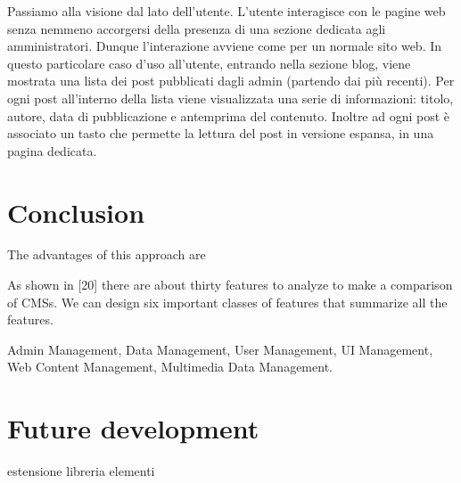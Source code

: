 \documentclass{sig-alternate}
\begin{document}
Passiamo alla visione dal lato dell'utente. 
L'utente interagisce con le pagine web senza nemmeno accorgersi della presenza di una sezione dedicata agli amministratori. Dunque l'interazione avviene come per un normale sito web. In questo particolare caso d'uso all'utente, entrando nella sezione blog, viene mostrata una lista dei post pubblicati dagli admin (partendo dai più recenti). Per ogni post all'interno della lista viene visualizzata una serie di informazioni: titolo, autore, data di pubblicazione e antemprima del contenuto. Inoltre ad ogni post è associato un tasto che permette la lettura del post in versione espansa, in una pagina dedicata.
\section{Conclusion}

The advantages of this approach are
 
As shown in [20] there are about thirty features to analyze to make a comparison of CMSs. We can design six important classes of features that summarize all the features.

Admin Management, Data Management, User Management, UI Management, Web Content Management, Multimedia Data Management.




\section{Future development}

estensione libreria elementi




%

%
%
\end{document}
